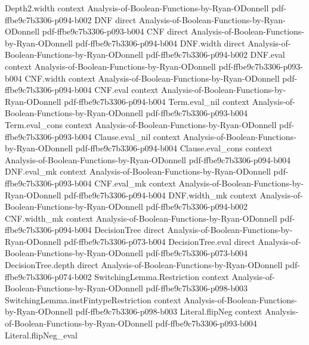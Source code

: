 \begin{theorem}
\proofstep
  {Depth2.width}
  {context}
  {Analysis-of-Boolean-Functions-by-Ryan-ODonnell}
  {pdf-ffbe9c7b3306-p094-b002}
\proofstep
  {DNF}
  {direct}
  {Analysis-of-Boolean-Functions-by-Ryan-ODonnell}
  {pdf-ffbe9c7b3306-p093-b004}
\proofstep
  {CNF}
  {direct}
  {Analysis-of-Boolean-Functions-by-Ryan-ODonnell}
  {pdf-ffbe9c7b3306-p094-b004}
\proofstep
  {DNF.width}
  {direct}
  {Analysis-of-Boolean-Functions-by-Ryan-ODonnell}
  {pdf-ffbe9c7b3306-p094-b002}
\proofstep
  {DNF.eval}
  {context}
  {Analysis-of-Boolean-Functions-by-Ryan-ODonnell}
  {pdf-ffbe9c7b3306-p093-b004}
\proofstep
  {CNF.width}
  {context}
  {Analysis-of-Boolean-Functions-by-Ryan-ODonnell}
  {pdf-ffbe9c7b3306-p094-b004}
\proofstep
  {CNF.eval}
  {context}
  {Analysis-of-Boolean-Functions-by-Ryan-ODonnell}
  {pdf-ffbe9c7b3306-p094-b004}
\proofstep
  {Term.eval_nil}
  {context}
  {Analysis-of-Boolean-Functions-by-Ryan-ODonnell}
  {pdf-ffbe9c7b3306-p093-b004}
\proofstep
  {Term.eval_cons}
  {context}
  {Analysis-of-Boolean-Functions-by-Ryan-ODonnell}
  {pdf-ffbe9c7b3306-p093-b004}
\proofstep
  {Clause.eval_nil}
  {context}
  {Analysis-of-Boolean-Functions-by-Ryan-ODonnell}
  {pdf-ffbe9c7b3306-p094-b004}
\proofstep
  {Clause.eval_cons}
  {context}
  {Analysis-of-Boolean-Functions-by-Ryan-ODonnell}
  {pdf-ffbe9c7b3306-p094-b004}
\proofstep
  {DNF.eval_mk}
  {context}
  {Analysis-of-Boolean-Functions-by-Ryan-ODonnell}
  {pdf-ffbe9c7b3306-p093-b004}
\proofstep
  {CNF.eval_mk}
  {context}
  {Analysis-of-Boolean-Functions-by-Ryan-ODonnell}
  {pdf-ffbe9c7b3306-p094-b004}
\proofstep
  {DNF.width_mk}
  {context}
  {Analysis-of-Boolean-Functions-by-Ryan-ODonnell}
  {pdf-ffbe9c7b3306-p094-b002}
\proofstep
  {CNF.width_mk}
  {context}
  {Analysis-of-Boolean-Functions-by-Ryan-ODonnell}
  {pdf-ffbe9c7b3306-p094-b004}
\proofstep
  {DecisionTree}
  {direct}
  {Analysis-of-Boolean-Functions-by-Ryan-ODonnell}
  {pdf-ffbe9c7b3306-p073-b004}
\proofstep
  {DecisionTree.eval}
  {direct}
  {Analysis-of-Boolean-Functions-by-Ryan-ODonnell}
  {pdf-ffbe9c7b3306-p073-b004}
\proofstep
  {DecisionTree.depth}
  {direct}
  {Analysis-of-Boolean-Functions-by-Ryan-ODonnell}
  {pdf-ffbe9c7b3306-p074-b002}
\proofstep
  {SwitchingLemma.Restriction}
  {context}
  {Analysis-of-Boolean-Functions-by-Ryan-ODonnell}
  {pdf-ffbe9c7b3306-p098-b003}
\proofstep
  {SwitchingLemma.instFintypeRestriction}
  {context}
  {Analysis-of-Boolean-Functions-by-Ryan-ODonnell}
  {pdf-ffbe9c7b3306-p098-b003}
\proofstep
  {Literal.flipNeg}
  {context}
  {Analysis-of-Boolean-Functions-by-Ryan-ODonnell}
  {pdf-ffbe9c7b3306-p093-b004}
\proofstep
  {Literal.flipNeg_eval}

\end{theorem}
